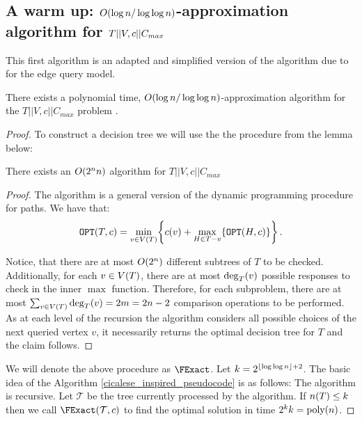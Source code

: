 
\subsection{A warm up: $O\mathopen{}\left( \log n/\log\log n \right)$-approximation algorithm  for $T||V,c||C_{max}$}
\label{sec:log_n_log_log_n_approx}
This first algorithm is an adapted and simplified version of the algorithm due to \cite{Cicalese2016OnTSPwNonUniCost} for the edge query model.
\begin{theorem}
    There exists a polynomial time, $O\mathopen{}\left( \log n/\log\log n \right)$-approximation algorithm for the $T||V,c||C_{max}$ problem .
    \begin{proof}
        
To construct a decision tree we will use the the procedure from the lemma below:
\begin{lemma}
    There exists an $O\mathopen{}\left( 2^nn \right)$ algorithm for $T||V,c||C_{max}$
    \begin{proof}
        The algorithm is a general version of the dynamic programming procedure for paths. We have that:
        $$
        \texttt{OPT}\mathopen{}\left( T,c \right) = \min_{v\in V\mathopen{}\left( T \right)}\mathopen{}\left\{ c\mathopen{}\left( v \right)+\max_{H\in T-v}\mathopen{}\left\{ \texttt{OPT}\mathopen{}\left( H,c \right) \right\} \right\}.
        $$

        Notice, that there are at most $O\mathopen{}\left( 2^n \right)$ different subtrees of $T$ to be checked. Additionally, for each $v\in V\mathopen{}\left( T \right)$, there are at most $\deg_T\mathopen{}\left( v \right)$ possible responses to check in the inner $\max$ function. Therefore, for each subproblem, there are at most
        $
        \sum_{v\in V\mathopen{}\left( T \right)}\deg_T\mathopen{}\left( v \right) = 2m = 2n-2
        $
        comparison operations to be performed. As at each level of the recursion the algorithm considers all possible choices of the next queried vertex $v$, it necessarily returns the optimal decision tree for $T$ and the claim follows.
    \end{proof}
\end{lemma}

We will denote the above procedure as $\FExact$.
Let $k=2^{\mathopen{}\left\lfloor \log\log n \right\rfloor+2}$.
The basic idea of the Algorithm \ref{cicalese_inspired_pseudocode} is as follows: The algorithm is recursive. Let $\mathcal{T}$ be the tree currently processed by the algorithm. If $n\mathopen{}\left( T \right)\leq k$ then we call $\FExact\br{\mathcal{T}, c}$ to find the optimal solution in time $2^kk=\text{poly}\mathopen{}\left( n \right)$.


\end{proof}
\end{theorem}
